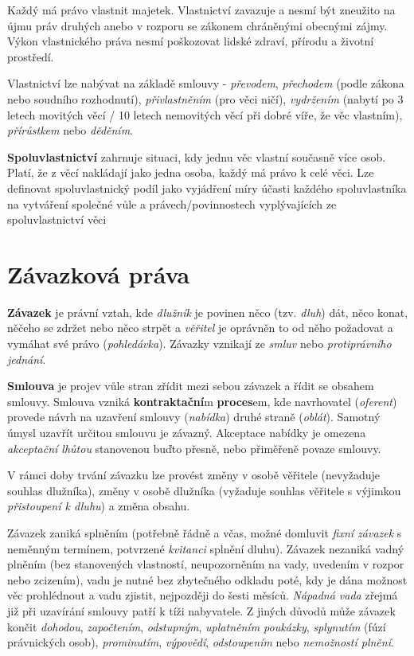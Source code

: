 Každý má právo vlastnit majetek. Vlastnictví zavazuje a nesmí být zneužito na újmu práv druhých anebo v rozporu se zákonem chráněnými obecnými zájmy. Výkon vlastnického práva nesmí poškozovat lidské zdraví, přírodu a životní prostředí.

Vlastnictví lze nabývat na základě smlouvy - \textit{převodem}, \textit{přechodem} (podle zákona nebo soudního rozhodnutí), \textit{přivlastněním} (pro věci ničí), \textit{vydržením} (nabytí po 3 letech movitých věcí / 10 letech nemovitých věcí při dobré víře, že věc vlastním), \textit{přírůstkem} nebo \textit{děděním}.

\textbf{Spoluvlastnictví} zahrnuje situaci, kdy jednu věc vlastní současně více osob. Platí, že z věcí nakládají jako jedna osoba, každý má právo k celé věci. Lze definovat spoluvlastnický podíl jako vyjádření míry účasti každého spoluvlastníka na vytváření společné vůle a právech/povinnostech vyplývajících ze spoluvlastnictví věci

\section{Závazková práva}

\textbf{Závazek} je právní vztah, kde \textit{dlužník} je povinen něco (tzv. \textit{dluh}) dát, něco konat, něčeho se zdržet nebo něco strpět a \textit{věřitel} je oprávněn to od něho požadovat a vymáhat své právo (\textit{pohledávka}). Závazky vznikají ze \textit{smluv} nebo \textit{protiprávního jednání}.

\textbf{Smlouva} je projev vůle stran zřídit mezi sebou závazek a řídit se obsahem smlouvy. Smlouva vzniká \textbf{kontraktační}m \textbf{proces}em, kde navrhovatel (\textit{oferent}) provede návrh na uzavření smlouvy (\textit{nabídka}) druhé straně (\textit{oblát}). Samotný úmysl uzavřít určitou smlouvu je závazný. Akceptace nabídky je omezena \textit{akceptační lhůtou} stanovenou buďto přesně, nebo přiměřeně povaze smlouvy.

V rámci doby trvání závazku lze provést změny v osobě věřitele (nevyžaduje souhlas dlužníka), změny v osobě dlužníka (vyžaduje souhlas věřitele s výjimkou \textit{přistoupení k dluhu}) a změna obsahu.

Závazek zaniká splněním (potřebně řádně a včas, možné domluvit \textit{fixní závazek} s neměnným termínem, potvrzené \textit{kvitanci} splnění dluhu). Závazek nezaniká vadný plněním (bez stanovených vlastností, neupozorněním na vady, uvedením v rozpor nebo zcizením), vadu je nutné bez zbytečného odkladu poté, kdy je dána možnost věc prohlédnout a vadu zjistit, nejpozději do šesti měsíců. \textit{Nápadná vada} zřejmá již při uzavírání smlouvy patří k tíži nabyvatele. Z jiných důvodů může závazek končit \textit{dohodou}, \textit{započtením}, \textit{odstupným}, \textit{uplatněním poukázky}, \textit{splynutím} (fúzí právnických osob), \textit{prominutím}, \textit{výpovědí}, \textit{odstoupením} nebo \textit{nemožností plnění}.


